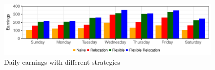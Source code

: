 \begin{figure}
	\caption{Daily earnings with different strategies}
	\label{fig:daily_earnings}
	\includegraphics{figures/daily_earnings.pdf}
\end{figure}





